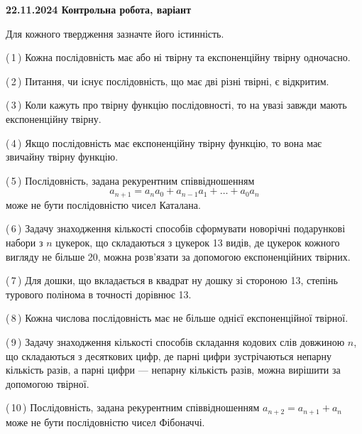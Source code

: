 \documentclass[12pt, ukrainian]{article}
\begin{document}
\begin {large}
\begin {large}
\begin {large}
\begin {large}
\begin {large}
\begin {large}
\begin {large}
\begin {large}
\begin {large}
\begin {large}
\begin {large}
\begin {large}
\begin {large}
\begin {large}
\textbf{22.11.2024 Контрольна робота, варіант  }\par


{
Для кожного твердження зазначте його істинність.\par

\vspace{2mm}

(\,1\,) Кожна послідовність має або ні твірну та експоненційну твірну одночасно.%



(\,2\,) Питання, чи існує послідовність, що має дві різні твірні, є відкритим.%



(\,3\,) Коли кажуть про твірну функцію послідовності, то на увазі завжди мають експоненційну твірну.%



(\,4\,) Якщо послідовність має експоненційну твірну функцію, то вона має звичайну твірну функцію.%



(\,5\,) Послідовність, задана рекурентним співвідношенням $$a_{n+1}=a_{n}a_{0}+a_{n-1}a_{1}+\ldots+a_0a_{n}$$ може не бути послідовністю чисел Каталана.%



(\,6\,) Задачу знаходження кількості способів сформувати новорічні подарункові набори з $n$ цукерок, що складаються з цукерок 13 видів, де цукерок кожного вигляду не більше 20, можна розв’язати за допомогою експоненційних твірних.%



(\,7\,) Для дошки, що вкладається в квадрат ну дошку зі стороною 13, степінь турового полінома в точності дорівнює 13.%



(\,8\,) Кожна числова послідовність має не більше однієї  експоненційної твірної.%



(\,9\,) Задачу знаходження кількості способів складання кодових слів довжиною $n$, що складаються з десяткових цифр, де парні цифри зустрічаються непарну кількість разів, а парні цифри — непарну кількість разів, можна вирішити за допомогою твірної.%



(\,10\,) Послідовність, задана рекурентним співвідношенням $a_{n+2}=a_{n+1}+a_{n}$ може не бути послідовністю чисел Фібоначчі.%




\vspace{5mm}
}
\newpage


\end{large}
\end{large}
\end{large}
\end{large}
\end{large}
\end{large}
\end{large}
\end{large}
\end{large}
\end{large}
\end{large}
\end{large}
\end{large}
\end{large}
\end{document}

